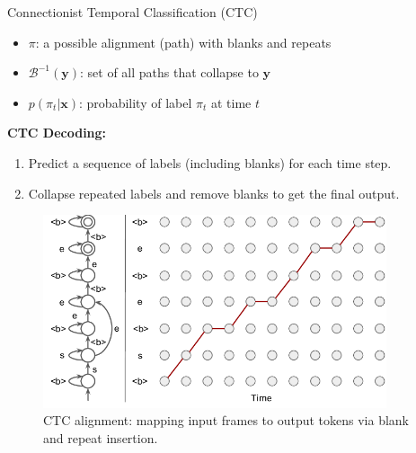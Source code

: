 \begin{frame}[t,allowframebreaks]{Connectionist Temporal Classification (CTC)}
    \begin{itemize}
        \item $\pi$: a possible alignment (path) with blanks and repeats
        \item $\mathcal{B}^{-1}(\mathbf{y})$: set of all paths that collapse to $\mathbf{y}$
        \item $p(\pi_t | \mathbf{x})$: probability of label $\pi_t$ at time $t$
    \end{itemize}

    \textbf{CTC Decoding:}
    \begin{enumerate}
        \item Predict a sequence of labels (including blanks) for each time step.
        \item Collapse repeated labels and remove blanks to get the final output.
    \end{enumerate}

    \begin{figure}
        \centering
        \includegraphics[width=0.9\textwidth]{images/audio-nlp/ctc-alignment.png}
        \caption*{CTC alignment: mapping input frames to output tokens via blank and repeat insertion.}
    \end{figure}
\end{frame}